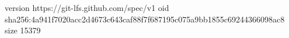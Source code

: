 version https://git-lfs.github.com/spec/v1
oid sha256:4a941f7020acc2d4673c643caf88f7f687195c075a9bb1855c69244366098ac8
size 15379
